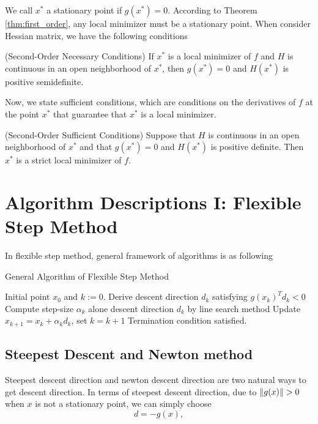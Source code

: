 \documentclass[11pt]{report}
\begin{document}
We call $x^*$ a stationary point if $g(x^*)=0$. According to Theorem \ref{thm:first_order}, any local minimizer must be a stationary point. When consider Hessian matrix, we have the following conditions
\begin{theorem}(Second-Order Necessary Conditions)
If $x^*$ is a local minimizer of $f$ and $H$ is continuous in an open neighborhood of $x^*$, then $g(x^*) = 0$ and $H(x^*)$ is positive semidefinite.
\end{theorem}

Now, we state sufficient conditions, which are conditions on the derivatives of $f$ at the point $x^*$ that guarantee that $x^*$ is a local minimizer.
\begin{theorem}(Second-Order Sufficient Conditions)
Suppose that $H$ is continuous in an open neighborhood of $x^*$ and that $g(x^*) = 0$ and $H(x^*)$ is positive definite. Then $x^*$ is a strict local minimizer of $f$.  
\end{theorem}

\chapter{Algorithm Descriptions I: Flexible Step Method}\label{chp: flexible}
In flexible step method, general framework of algorithms is as following
\begin{algorithm}[H]
\caption{General Algorithm of Flexible Step Method}
\label{alg:General Flexible}
\begin{algorithmic}[1]
\REQUIRE Initial point $x_0$ and $k:=0$.
\REPEAT 
    \STATE Derive descent direction $d_k$ satisfying $g(x_k)^Td_k<0$
    \STATE Compute step-size $\alpha_k$ alone descent direction $d_k$ by line search method
    \STATE Update $x_{k+1} = x_k + \alpha_k d_k$, set $k = k + 1$
\UNTIL Termination condition satisfied.
\end{algorithmic}
\end{algorithm}

\section{Steepest Descent and Newton method}

Steepest descent direction and newton descent direction are two natural ways to get descent direction. In terms of steepest descent direction, due to $\|g(x)\| >0$ when $x$ is not a stationary point, we can simply choose 
\begin{equation}
    d = -g(x),
\end{equation}
\end{document}

